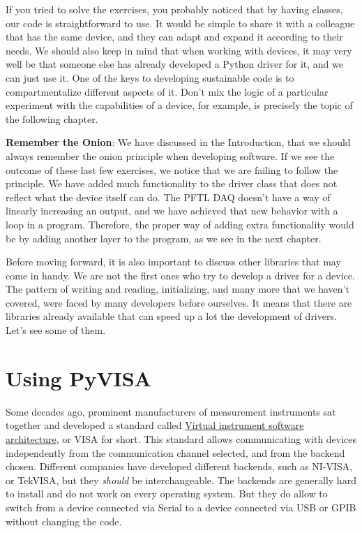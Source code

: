 

If you tried to solve the exercises, you probably noticed that by having classes, our code is straightforward to use. It would be simple to share it with a colleague that has the same device, and they can adapt and expand it according to their needs. We should also keep in mind that when working with devices, it may very well be that someone else has already developed a Python driver for it, and we can just use it. One of the keys to developing sustainable code is to compartmentalize different aspects of it. Don't mix the logic of a particular experiment with the capabilities of a device, for example, is precisely the topic of the following chapter.

\textbf{Remember the Onion}: We have discussed in the Introduction, that we should always remember the onion principle when developing software. If we see the outcome of these last few exercises, we notice that we are failing to follow the principle. We have added much functionality to the driver class that does not reflect what the device itself can do. The {PFTL DAQ} doesn't have a way of linearly increasing an output, and we have achieved that new behavior with a loop in a program. Therefore, the proper way of adding extra functionality would be by adding another layer to the program, as we see in the next chapter.

Before moving forward, it is also important to discuss other libraries that may come in handy. We are not the first ones who try to develop a driver for a device. The pattern of writing and reading, initializing, and many more that we haven't covered, were faced by many developers before ourselves. It means that there are libraries already available that can speed up a lot the development of drivers. Let's see some of them.

\section{Using PyVISA}\label{sec:pyvisa}
Some decades ago, prominent manufacturers of measurement instruments sat together and developed a standard called \href{https://en.wikipedia.org/wiki/Virtual_instrument_software_architecture}{Virtual instrument software architecture}, or VISA for short. This standard allows communicating with devices independently from the communication channel selected, and from the backend chosen. Different companies have developed different backends, such as NI-VISA, or TekVISA, but they \emph{should} be interchangeable. The backends are generally hard to install and do not work on every operating system. But they do allow to switch from a device connected via Serial to a device connected via USB or GPIB without changing the code.

